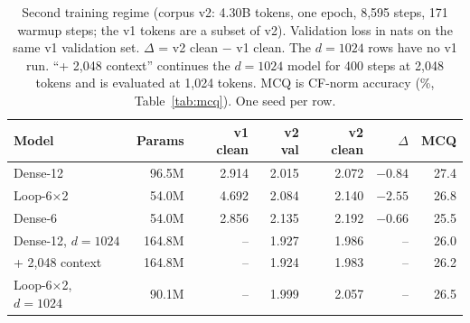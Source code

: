\begin{table}[t]
\centering
\caption{Second training regime (corpus v2: 4.30B tokens, one epoch, 8{,}595 steps, 171 warmup steps; the v1 tokens are a subset of v2). Validation loss in nats on the same v1 validation set. $\Delta$ = v2 clean $-$ v1 clean. The $d{=}1024$ rows have no v1 run. ``+ 2,048 context'' continues the $d{=}1024$ model for 400 steps at 2{,}048 tokens and is evaluated at 1{,}024 tokens. MCQ is CF-norm accuracy (\%, Table~\ref{tab:mcq}). One seed per row.}
\label{tab:v2}
\setlength{\tabcolsep}{2.8pt}
\begin{tabular}{lrrrrrr}
\toprule
Model & Params & v1 clean & v2 val & v2 clean & $\Delta$ & MCQ \\
\midrule
Dense-12 & 96.5M & 2.914 & 2.015 & 2.072 & $-0.84$ & 27.4 \\
Loop-6$\times$2 & 54.0M & 4.692 & 2.084 & 2.140 & $-2.55$ & 26.8 \\
Dense-6 & 54.0M & 2.856 & 2.135 & 2.192 & $-0.66$ & 25.5 \\
Dense-12, $d{=}1024$ & 164.8M & -- & 1.927 & 1.986 & -- & 26.0 \\
\quad + 2,048 context & 164.8M & -- & 1.924 & 1.983 & -- & 26.2 \\
Loop-6$\times$2, $d{=}1024$ & 90.1M & -- & 1.999 & 2.057 & -- & 26.5 \\
\bottomrule
\end{tabular}
\end{table}
